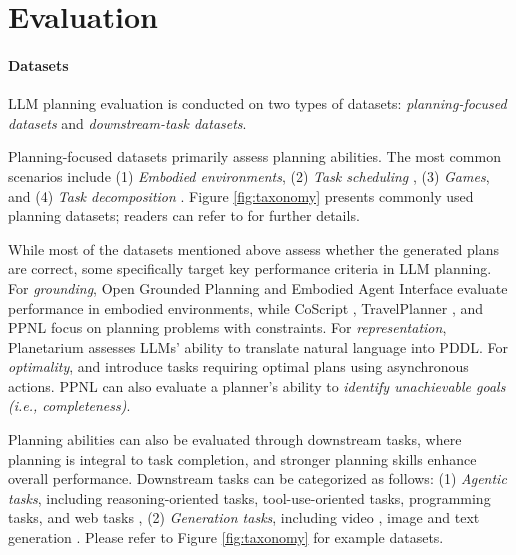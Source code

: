 \section{Evaluation} \label{sec:evaluation}

\vspace{-0.05in}
 \paragraph{Datasets}  LLM planning evaluation is conducted on two types of datasets: \emph{planning-focused datasets} and \emph{downstream-task datasets}. 

Planning-focused datasets primarily assess planning abilities. The most common scenarios include (1) \emph{Embodied environments}, (2) \emph{Task scheduling} , (3) \emph{Games}, and (4) \emph{Task decomposition} \cite{li2024lasp}. Figure \ref{fig:taxonomy} presents commonly used planning datasets; readers can refer to \citet{li2024lasp} for further details.

While most of the datasets mentioned above assess whether the generated plans are correct, some specifically target key performance criteria in LLM planning. For \emph{grounding}, Open Grounded Planning \cite{guo2024opengrounded} and Embodied Agent Interface \cite{li2024embodied} evaluate performance in embodied environments, while CoScript \cite{yuan2023distilling}, TravelPlanner \cite{xie2023translating}, and PPNL \cite{aghzal2023can} focus on planning problems with constraints. For \emph{representation}, Planetarium \cite{zuo2024planetarium} assesses LLMs' ability to translate natural language into PDDL. For \emph{optimality}, \citet{lin2024graph} and \citet{gonzalez2025robotouille} introduce tasks requiring optimal plans using asynchronous actions. PPNL \cite{aghzal2023can} can also evaluate a planner’s ability to \emph{identify unachievable goals (i.e., completeness)}.

Planning abilities can also be evaluated through downstream tasks, where planning is integral to task completion, and stronger planning skills enhance overall performance. Downstream tasks can be categorized as follows: (1) \emph{Agentic tasks}, including reasoning-oriented tasks, tool-use-oriented tasks, programming tasks, and web tasks \cite{zhou2023webarena, liu2023agentbench, li2023api, xu2023tool}, (2) \emph{Generation tasks}, including video \cite{lin2023videodirectorgpt}, image \cite{zala2023diagrammergpt} and text generation \cite{moryossef2019step}. Please refer to Figure \ref{fig:taxonomy} for example datasets.
 

